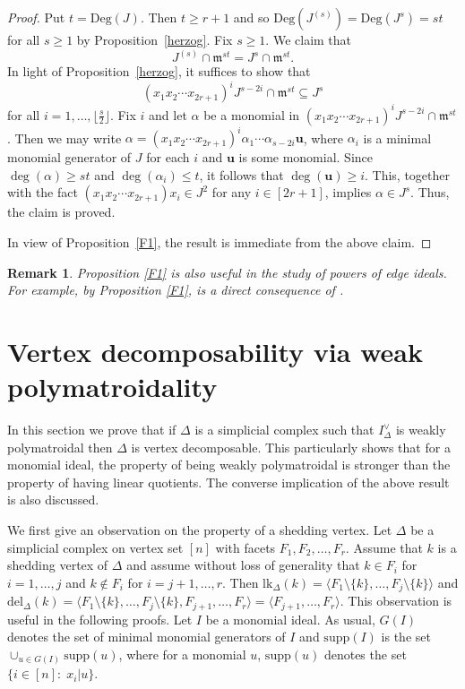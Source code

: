 \documentclass[12pt]{amsart}
\let\:=\colon
\newtheorem{Remark}[Theorem]{Remark}
\begin{document}
\begin{proof} Put $t=\mathrm{Deg}(J)$. Then $t\geq r+1$ and so $\mathrm{Deg}(J^{(s)})=\mathrm{Deg}(J^s)=st$ for all $s\geq 1$ by Proposition~\ref{herzog}. Fix $s\geq 1$. We claim that $$J^{(s)}\cap \mathfrak{m}^{st}=J^{s}\cap \mathfrak{m}^{st}.$$   In light of  Proposition~\ref{herzog}, it suffices to show that $$(x_1x_2\cdots x_{2r+1})^iJ^{s-2i}\cap \mathfrak{m}^{st} \subseteq J^s$$ for all $i=1,\ldots, \lfloor\frac{s}{2}\rfloor$.
Fix $i$ and let $\alpha$ be a  monomial  in  $(x_1x_2\cdots x_{2r+1})^iJ^{s-2i}\cap \mathfrak{m}^{st}$. Then we may write  $\alpha=(x_1x_2\cdots x_{2r+1})^i\alpha_1\cdots \alpha_{s-2i}\mathbf{u}$, where $\alpha_i$ is a minimal monomial generator of $J$ for each $i$ and $\mathbf{u}$ is some monomial. Since $\deg(\alpha)\geq st$ and $\deg(\alpha_i)\leq t$, it follows that $\deg(\mathbf{u})\geq i$. This, together with the fact  $(x_1x_2\cdots x_{2r+1})x_i\in J^2$ for any $i\in [2r+1]$, implies $\alpha\in J^{s}$.  Thus, the claim is proved.

In view of Proposition~\ref{F1}, the result is immediate from the above claim.
\end{proof}



\begin{Remark} \em Proposition \ref{F1} is also useful in the study of powers of edge ideals.  For example, by  Proposition \ref{F1}, \cite[Theorem 3.5]{JK} is a direct consequence of \cite[Corollary 3.3]{JK}.
\end{Remark}

\section{Vertex decomposability via weak polymatroidality}

In this section we prove that if $\Delta$ is a simplicial complex such that $I_{\Delta}^{\vee}$ is weakly polymatroidal then $\Delta$ is vertex decomposable. This particularly shows that for a monomial ideal, the property of being weakly polymatroidal  is stronger than the property of having linear quotients. The converse implication of the above result is also discussed.









We first give an observation on the property of a shedding vertex. Let $\Delta$ be a simplicial complex on vertex set $[n]$ with facets $ F_1,F_2, \ldots,F_r$. Assume that $k$ is a shedding vertex of $\Delta$ and assume  without loss of generality that $k\in F_i$ for $i=1,\ldots,j$ and $k\notin F_i$ for $i=j+1,\ldots,r$. Then $\mbox{lk}_{\Delta}(k)=\langle F_1\setminus \{k\}, \ldots, F_j\setminus \{k\}\rangle$ and  $\mbox{del}_{\Delta}(k)=\langle F_1\setminus \{k\}, \ldots, F_j\setminus \{k\}, F_{j+1}, \ldots, F_r\rangle=\langle F_{j+1}, \ldots, F_r\rangle$. This observation is useful in the following proofs. Let $I$ be a monomial ideal.
As usual, $G(I)$ denotes the set of minimal monomial generators of $I$ and $\mathrm{supp}(I)$ is the set $\cup_{u\in G(I)}\mathrm{supp}(u)$, where for a monomial $u$,   $\mathrm{supp}(u)$ denotes the set $\{i\in [n]\:\; x_i| u\}$.
\end{document}

